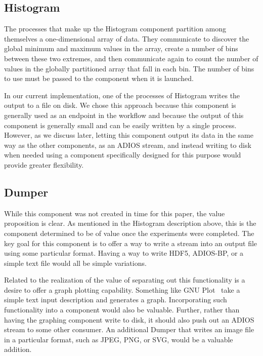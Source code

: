 \documentclass[conference]{IEEEtran}
\begin{document}
\subsection{Histogram}

The processes that make up the Histogram component partition among themselves
a one-dimensional array of data. They communicate to discover the global
minimum and maximum values in the array, create a number of bins between these
two extremes, and then communicate again to count the number of values in the
globally partitioned array that fall in each bin. The number of bins to use
must be passed to the component when it is launched.

In our current implementation, one of the processes of Histogram writes the
output to a file on disk. We chose this approach because this component is
generally used as an endpoint in the workflow and because the output of this
component is generally small and can be easily written by a single process.
However, as we discuss later, letting this component output its data in the
same way as the other components, as an ADIOS stream, and instead writing to
disk when needed using a component specifically designed for this purpose would
provide greater flexibility.

\subsection{Dumper}

While this component was not created in time for this paper, the value
proposition is clear. As mentioned in the Histogram description above, this is
the component determined to be of value once the experiments were completed.
The key goal for this component is to offer a way to write a stream into an
output file using some particular format. Having a way to write HDF5, ADIOS-BP,
or a simple text file would all be simple variations.

Related to the realization of the value of separating out this functionality is
a desire to offer a graph plotting capability. Something like GNU
Plot~\cite{racine:2006:gnuplot} take a simple text input description and
generates a graph.  Incorporating such functionality into a component would
also be valuable.  Further, rather than having the graphing component write to
disk, it should also push out an ADIOS stream to some other consumer. An
additional Dumper that writes an image file in a particular format, such as
JPEG, PNG, or SVG, would be a valuable addition.
\end{document}
